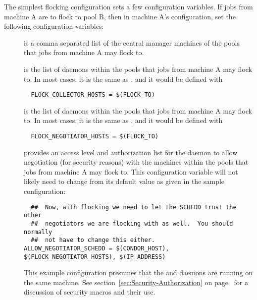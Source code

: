The simplest flocking configuration sets
a few configuration variables.
If jobs from machine A are to flock to pool B, 
then in machine A's configuration,
set the following configuration variables:
\begin{description}
  \item[] is a comma separated list of the central
  manager machines of the pools that jobs from machine A may flock to.
  \item[]
  is the list of  daemons within the pools
  that jobs from machine A may flock to.
  In most cases, it is the same as , and
  it would be defined with 
  \begin{verbatim}
  FLOCK_COLLECTOR_HOSTS = $(FLOCK_TO)
  \end{verbatim}
  \item[]
  is the list of  daemons within the pools
  that jobs from machine A may flock to.
  In most cases, it is the same as , and
  it would be defined with 
  \begin{verbatim}
  FLOCK_NEGOTIATOR_HOSTS = $(FLOCK_TO)
  \end{verbatim}
  \item[]
  provides an access level and authorization list for the
   daemon to allow negotiation (for security
  reasons) with the machines within the pools
  that jobs from machine A may flock to.
  This configuration variable will not likely need to change
  from its default value as given in the sample configuration:
  \footnotesize
  \begin{verbatim}
  ##  Now, with flocking we need to let the SCHEDD trust the other
  ##  negotiators we are flocking with as well.  You should normally
  ##  not have to change this either.
ALLOW_NEGOTIATOR_SCHEDD = $(CONDOR_HOST), $(FLOCK_NEGOTIATOR_HOSTS), $(IP_ADDRESS)
  \end{verbatim}
  \normalsize
  This example configuration presumes that the 
  and  daemons are running on the same machine.
  See 
  section~\ref{sec:Security-Authorization} on
  page~\pageref{sec:Security-Authorization} for a discussion
  of security macros and their use.
\end{description}

